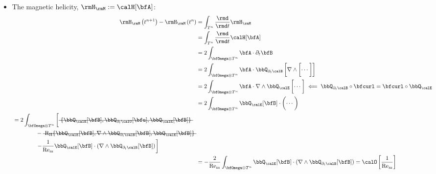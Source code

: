 \begin{itemize}
        \item  The magnetic helicity, $\rmH_{\rmM}  :=  \calH[\bfA]$:
        \begin{align}
                \rmH_{\rmM}\left(t^{n + 1}\right) - \rmH_{\rmM}\left(t^{n}\right)
                &=  \int_{T^{n}}\frac{\rmd}{\rmd t}\rmH_{\rmM}  \\
                &=  \int_{T^{n}}\frac{\rmd}{\rmd t}\calH[\bfA]  \\
                &=  2\int_{\bfOmega\otimes T^{n}}\bfA\cdot\partial_{t}\bfB  \\
                &=  2\int_{\bfOmega\otimes T^{n}}\bfA\cdot\bbQ_{\partial_{t}\calB}\left[\nabla\wedge\left[\cdots\tall\right]\right]  \\
                &=  2\int_{\bfOmega\otimes T^{n}}\bfA\cdot\nabla\wedge\bbQ_{\calE}\left[\cdots\tall\right]  \impliedby  \bbQ_{\partial_{t}\calB}\circ\bfcurl = \bfcurl\circ\bbQ_{\calE}  \\
                &=  2\int_{\bfOmega\otimes T^{n}}\bbQ_{\calE}[\bfB]\cdot\left(\cdots\tall\right)  \\
            \begin{split}
                &=  2\int_{\bfOmega\otimes T^{n}}\left[\mst{\{\bbQ_{\calE}[\bfB], \bbQ_{\partial_{t}\calU}[\bfu], \bbQ_{\calE}[\bfB]\}}\tall\right.  \\
                &\qquad\qquad- \mst{\rmRH\{\bbQ_{\calE}[\bfB], \nabla\wedge\bbQ_{\partial_{t}\calB}[\bfB], \bbQ_{\calE}[\bfB]\}}  \\
                &\qquad\qquad\left.- \frac{1}{\rmRem}\bbQ_{\calE}[\bfB]\cdot(\nabla\wedge\bbQ_{\partial_{t}\calB}[\bfB])\tall\right]
            \end{split}  \\
                &=  - \frac{2}{\rmRem}\int_{\bfOmega\otimes T^{n}}\bbQ_{\calE}[\bfB]\cdot(\nabla\wedge\bbQ_{\partial_{t}\calB}[\bfB])  =  \calO\left[\frac{1}{\rmRem}\right]
        \end{align}
    \end{itemize}
    
    \shortline

